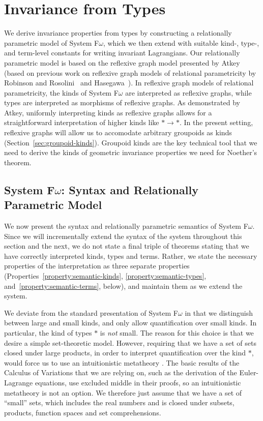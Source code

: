 \documentclass{sigplanconf}
\theoremstyle{examplestyle}
\begin{document}
\section{Invariance from Types}
\label{sec:symmetry-from-types}

We derive invariance properties from types by constructing a
relationally parametric model of System F$\omega$, which we then
extend with suitable kind-, type-, and term-level constants for
writing invariant Lagrangians. Our relationally parametric model is
based on the reflexive graph model presented by
Atkey~\cite{atkey12relational} (based on previous work on reflexive
graph models of relational parametricity by Robinson and
Rosolini~\cite{robinson94reflexive} and
Hasegawa~\cite{hasegawa94relational}). In reflexive graph models of
relational parametricity, the kinds of System F$\omega$ are
interpreted as reflexive graphs, while types are interpreted as
morphisms of reflexive graphs. As demonstrated by Atkey, uniformly
interpreting kinds as reflexive graphs allows for a straightforward
interpretation of higher kinds like $* \to *$. In the present setting,
reflexive graphs will allow us to accomodate arbitrary groupoids as
kinds (Section~\ref{sec:groupoid-kinds}). Groupoid kinds are the key
technical tool that we need to derive the kinds of geometric
invariance properties we need for Noether's theorem.

\subsection{System F$\omega$: Syntax and Relationally Parametric Model}
\label{sec:refl-graphs-for-fomega}

We now present the syntax and relationally parametric semantics of
System F$\omega$. Since we will incrementally extend the syntax of the
system throughout this section and the next, we do not state a final
triple of theorems stating that we have correctly interpreted kinds,
types and terms. Rather, we state the necessary properties of the
interpretation as three separate properties
(Properties~\ref{property:semantic-kinds},
\ref{property:semantic-types}, and~\ref{property:semantic-terms},
below), and maintain them as we extend the system.

We deviate from the standard presentation of System F$\omega$ in that
we distinguish between large and small kinds, and only allow
quantification over small kinds. In particular, the kind of types $*$
is \emph{not} small. The reason for this choice is that we desire a
simple set-theoretic model. However, requiring that we have a set of
sets closed under large products, in order to interpret quantification
over the kind $*$, would force us to use an intuitionistic metatheory
\cite{pitts87polymorphism}. The basic results of the Calculus of
Variations that we are relying on, such as the derivation of the
Euler-Lagrange equations, use excluded middle in their proofs, so an
intuitionistic metatheory is not an option. We therefore just assume
that we have a set of ``small'' sets, which includes the real numbers
and is closed under subsets, products, function spaces and
set comprehensions.
\end{document}
